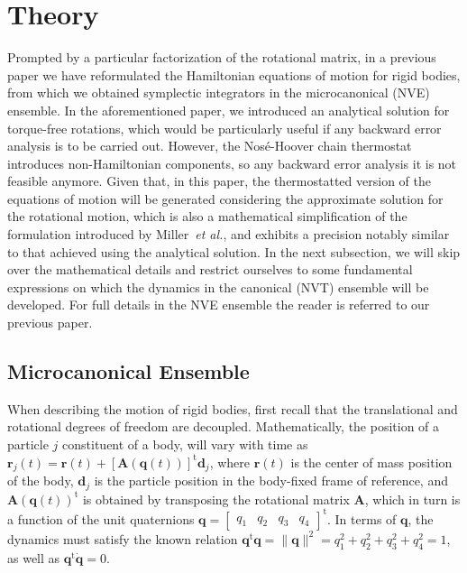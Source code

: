 \documentclass[aip,jcp,reprint,amsmath,amssymb]{revtex4-1}
\newcommand{\mt}[1]{\boldsymbol{\mathbf{#1}}}           %
\newcommand{\vt}[1]{\boldsymbol{\mathbf{#1}}}           %
\newcommand{\tr}[1]{#1^\text{t}}                        %
\begin{document}
\section{Theory}

Prompted by a particular factorization of the rotational matrix, in a previous paper\cite{Abreu_2017} we have reformulated the Hamiltonian equations of motion for rigid bodies, from which we obtained symplectic integrators in the microcanonical (NVE) ensemble. In the aforementioned paper, we introduced an analytical solution for torque-free rotations, which would be particularly useful if any backward error analysis\cite{Hairer_2006} is to be carried out. However, the  Nos\'{e}-Hoover chain thermostat introduces non-Hamiltonian components, so any backward error analysis it is not feasible anymore. Given that, in this paper, the thermostatted version of the equations of motion will be generated considering the approximate solution for the rotational motion, which is also a mathematical simplification of the formulation introduced by Miller~\textit{et al.}\cite{Miller2002}, and exhibits a precision notably similar to that achieved using the analytical solution. In the next subsection, we will skip over the mathematical details and restrict ourselves to some fundamental expressions on which the dynamics in the canonical (NVT) ensemble will be developed. For full details in the NVE ensemble the reader is referred to our previous paper.\cite{Abreu_2017}

\subsection{Microcanonical Ensemble}

When describing the motion of rigid bodies, first recall that the translational and rotational degrees of freedom are decoupled. Mathematically, the position of a particle $j$ constituent of a body, will vary with time as $\vt r_j(t) = \vt r(t) + \tr{[{\mt A}(\vt q(t))]}\vt d_j$, where $\vt r(t)$ is the center of mass position of the body, $\vt d_j$ is the particle position in the body-fixed frame of reference, and $\tr{\mt A(\vt q(t))}$ is obtained by transposing the rotational matrix $\mt A$, which in turn is a function of the unit quaternions $\vt q = \tr {[\begin{array}{cccc} q_1 & q_2 & q_3 & q_4 \end{array}]}$. In terms of $\vt q$, the dynamics must satisfy the known relation\cite{Goldstein2002} $\tr{\vt q}{\vt q} = \|\vt q\|^2 = q_1^2 + q_2^2 + q_3^2 + q_4^2 = 1$, as well as $\tr{\vt q}{\dot{\vt q}} = 0$.
\end{document}

